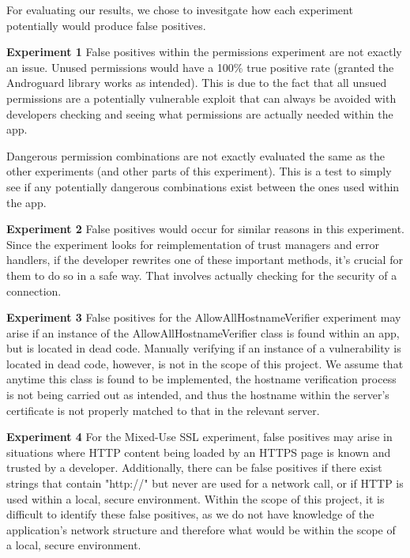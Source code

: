 For evaluating our results, we chose to invesitgate how each experiment potentially would produce false positives.

\textbf{Experiment 1}
False positives within the permissions experiment are not exactly an issue. Unused permissions would have a 100\% true positive rate (granted the Androguard library works as intended). 
This is due to the fact that all unsued permissions are a potentially vulnerable exploit that can always be avoided with developers checking and seeing what permissions are actually needed within the app. 

Dangerous permission combinations are not exactly evaluated the same as the other experiments (and other parts of this experiment). This is a test to simply see if any potentially dangerous combinations exist between 
the ones used within the app. 

\textbf{Experiment 2}
False positives would occur for similar reasons in this experiment. 
Since the experiment looks for reimplementation of trust managers and error handlers,
if the developer rewrites one of these important methods, 
it's crucial for them to do so in a safe way. 
That involves actually checking for the security of a connection.


\textbf{Experiment 3}
False positives for the AllowAllHostnameVerifier experiment may arise if an instance of the AllowAllHostnameVerifier 
class is found within an app, but is located in dead code. Manually verifying if an instance of a vulnerability is located 
in dead code, however, is not in the scope of this project. We assume that anytime this class is found to be implemented, the hostname verification process is not being carried out as intended, and thus the 
hostname within the server's certificate is not properly matched to that in the relevant server. 

\textbf{Experiment 4}
For the Mixed-Use SSL experiment, false positives may arise in situations where HTTP content being loaded by an HTTPS page is known and trusted by a developer. Additionally, there 
can be false positives if there exist strings that contain "http://" but never are used for a network call, or if HTTP is used within a local, secure environment. Within the scope of this
project, it is difficult to identify these false positives, as we do not have knowledge of the application's network structure and therefore what would be within the scope of a local, secure environment. 

